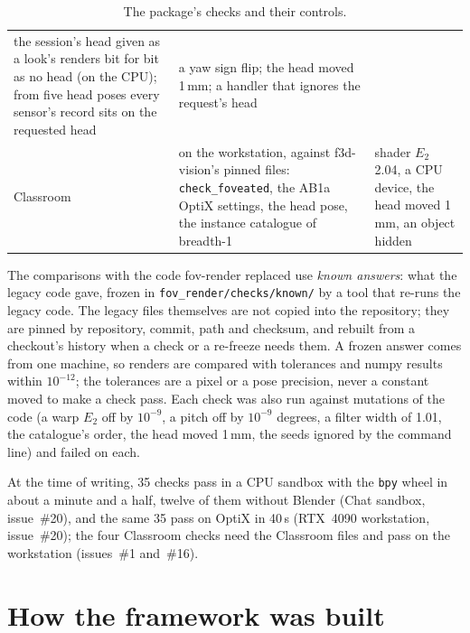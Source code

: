 \documentclass[11pt,a4paper]{article}
\newcommand{\code}[1]{\texttt{\small #1}}
\newcommand{\cell}{\raggedright\arraybackslash}
\begin{document}
\begin{table}[!htbp]
\begin{tabularx}{\textwidth}{@{}>{\cell}p{1.9cm} L >{\cell}p{4.3cm}@{}}
  the session's head given as a look's renders bit for bit as no head (on the CPU); from five head poses every
  sensor's record sits on the requested head & a yaw sign flip; the head moved 1\,mm; a handler that ignores the
  request's head \\
Classroom & on the workstation, against f3d-vision's pinned files: \code{check\_foveated}, the AB1a OptiX
  settings, the head pose, the instance catalogue of breadth-1 & shader $E_2$ 2.04, a CPU device, the head
  moved 1\,mm, an object hidden \\
\bottomrule
\end{tabularx}
\caption{The package's checks and their controls.}\label{tab:checks}
\end{table}

The comparisons with the code fov-render replaced use \emph{known answers}: what the legacy code gave, frozen in
\code{fov\_render/checks/known/} by a tool that re-runs the legacy code. The legacy files themselves are not
copied into the repository; they are pinned by repository, commit, path and checksum, and rebuilt from a
checkout's history when a check or a re-freeze needs them. A frozen answer comes from one machine, so renders are
compared with tolerances and numpy results within $10^{-12}$; the tolerances are a pixel or a pose precision, never a
constant moved to make a check pass. Each check was also run against mutations of the code
(a warp $E_2$ off by $10^{-9}$, a pitch off by $10^{-9}$ degrees, a filter width of 1.01, the catalogue's order,
the head moved 1\,mm, the seeds ignored by the command line) and failed on each.

At the time of writing, 35 checks pass in a CPU sandbox with the \code{bpy} wheel in about a minute and a half,
twelve of them without Blender (Chat sandbox, issue~\#20), and the same 35 pass on OptiX in 40\,s (RTX~4090
workstation, issue~\#20); the four Classroom checks need the Classroom files and pass on the workstation
(issues~\#1 and~\#16).

\section{How the framework was built}\label{sec:built}
\end{document}
